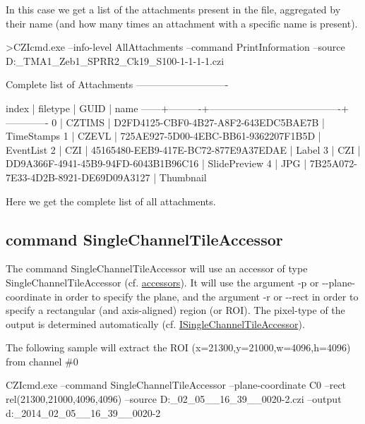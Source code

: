 In this case we get a list of the attachments present in the file, aggregated by their name (and how many times an attachment with a specific name is present). \begin{DoxyVerb}>CZIcmd.exe --info-level AllAttachments  --command PrintInformation --source D:\PICTURES\NaCZIrTestData\Example_TMA1_Zeb1_SPRR2_Ck19_S100-1-1-1-1.czi

Complete list of Attachments
----------------------------

index | filetype | GUID                                   | name
------+----------+----------------------------------------+-------------
    0 | CZTIMS   | {D2FD4125-CBF0-4B27-A8F2-643EDC5BAE7B} | TimeStamps
    1 | CZEVL    | {725AE927-5D00-4EBC-BB61-9362207F1B5D} | EventList
    2 | CZI      | {45165480-EEB9-417E-BC72-877E9A37EDAE} | Label
    3 | CZI      | {DD9A366F-4941-45B9-94FD-6043B1B96C16} | SlidePreview
    4 | JPG      | {7B25A072-7E33-4D2B-8921-DE69D09A3127} | Thumbnail
\end{DoxyVerb}


Here we get the complete list of all attachments.

\subsection*{command \textquotesingle{}Single\+Channel\+Tile\+Accessor\textquotesingle{}}

The command \textquotesingle{}Single\+Channel\+Tile\+Accessor\textquotesingle{} will use an accessor of type {\ttfamily Single\+Channel\+Tile\+Accessor} (cf. \hyperlink{accessors}{accessors}). It will use the argument \textquotesingle{}-\/p\textquotesingle{} or \textquotesingle{}-\/-\/plane-\/coordinate\textquotesingle{} in order to specify the plane, and the argument \textquotesingle{}-\/r\textquotesingle{} or \textquotesingle{}-\/-\/rect\textquotesingle{} in order to specify a rectangular (and axis-\/aligned) region (or R\+OI). The pixel-\/type of the output is determined automatically (cf. \hyperlink{classlib_c_z_i_1_1_i_single_channel_tile_accessor}{I\+Single\+Channel\+Tile\+Accessor}).

The following sample will extract the R\+OI (x=21300,y=21000,w=4096,h=4096) from channel \#0 \begin{DoxyVerb}CZIcmd.exe --command SingleChannelTileAccessor --plane-coordinate C0 --rect rel(21300,21000,4096,4096) --source D:\PICTURES{}_02_05__16_39__0020-2.czi --output d:\PICTURES\Out\Output_2014_02_05__16_39__0020-2
\end{DoxyVerb}


